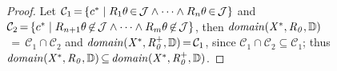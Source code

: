 \documentclass[acmsmall,screen,review,anonymous,nonacm]{acmart}
\begin{document}
\begin{lemma}
{\begin{proof}
Let $\mathcal{C}_1{\,=\,}\{c^*\mid R_1\theta{\,\in\,}\mathcal{J} \wedge \dots \wedge 
R_n\theta{\,\in\,}\mathcal{J}\}$ and $\mathcal{C}_2{\,=\,}\{c^*\mid R_{n{+}1}\theta{\,\not\in\,}\mathcal{J} 
\wedge \dots \wedge 
R_m\theta{\,\not\in\,}\mathcal{J}\}$,  
then 
$\mathit{domain}\mathit{(X^*, R_0, \mathbb{D})}$\\
${\,=\,}\mathcal{C}_1 \cap  \mathcal{C}_2 $ and 
$\mathit{domain}\mathit{(X^*, R_0^+, \mathbb{D})}{\,=\,} \mathcal{C}_1 $, 
since $\mathcal{C}_1 \cap  \mathcal{C}_2  \subseteq \mathcal{C}_1 $; thus $\mathit{domain}\mathit{(X^*, R_0, \mathbb{D})} {\,\subseteq\,} \mathit{domain}\mathit{(X^*, R_0^+, \mathbb{D})}$. 
\end{proof}}
\end{lemma}
\end{document}
